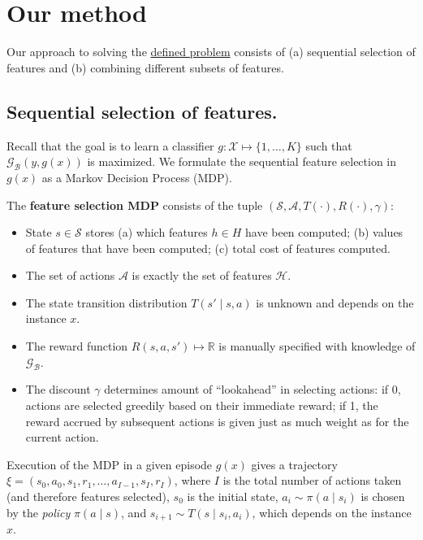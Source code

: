 \section{Our method}
Our approach to solving the \hyperref[def:problem]{defined problem} consists of (a) sequential selection of features and (b) combining different subsets of features.

\subsection{Sequential selection of features.}
Recall that the goal is to learn a classifier $g: \mathcal{X} \mapsto \{1,\dots,K\}$ such that $\mathcal{G}_\mathcal{B}(y, g(x))$ is maximized.
We formulate the sequential feature selection in $g(x)$ as a Markov Decision Process (MDP).

\begin{mydef} \label{def:MDP}
The \textbf{feature selection MDP} consists of the tuple $(\mathcal{S}, \mathcal{A}, T(\cdot), R(\cdot), \gamma)$:

\begin{itemize}
\item State $s \in \mathcal{S}$ stores (a) which features $h \in H$ have been computed; (b) values of features that have been computed; (c) total cost of features computed.
\item The set of actions $\mathcal{A}$ is exactly the set of features $\mathcal{H}$.
\item The state transition distribution $T(s' \mid s, a)$ is unknown and depends on the instance $x$.
\item The reward function $R(s, a, s') \mapsto \mathbb{R}$ is manually specified with knowledge of $\mathcal{G}_\mathcal{B}$.
\item The discount $\gamma$ determines amount of ``lookahead'' in selecting actions: if 0, actions are selected greedily based on their immediate reward; if 1, the reward accrued by subsequent actions is given just as much weight as for the current action.
\end{itemize}
\end{mydef}

Execution of the MDP in a given episode $g(x)$ gives a trajectory $\xi = (s_0, a_0, s_1, r_1, \dots, a_{I-1}, s_I, r_I)$, where $I$ is the total number of actions taken (and therefore features selected), $s_0$ is the initial state, $a_i \sim \pi(a \mid s_i)$ is chosen by the \emph{policy} $\pi(a \mid s)$, and $s_{i+1} \sim T(s \mid s_i, a_i)$, which depends on the instance $x$.

